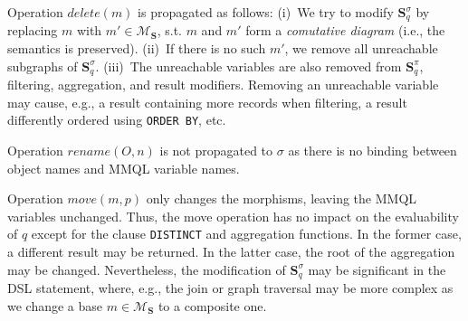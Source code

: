 Operation $delete(m)$ is propagated %
as follows: (i)~We try to modify $\mathbf{S}_q^{\sigma}$ by replacing $m$ with $m' \in \mathcal{M}_\mathbf{S}$, s.t. $m$ and $m'$ form a \textit{comutative diagram} (i.e., the semantics is preserved). 
(ii)~If there is no such $m'$, we remove all unreachable subgraphs of 
$\mathbf{S}_q^{\sigma}$.
(iii)~The unreachable variables are also removed from $\mathbf{S}_q^\pi$, filtering, aggregation, and result modifiers. %
Removing an unreachable variable may cause, e.g., a result containing more records when filtering, a result differently ordered using \texttt{ORDER BY}, etc.  

Operation $\textit{rename}(O, n)$ is not propagated to $\sigma$ as there is no binding between object names and MMQL variable names.

Operation $\textit{move}(m, p)$ only changes the morphisms, 
leaving the MMQL variables unchanged. Thus, the move operation has no impact on the evaluability of $q$ except for the clause \texttt{DISTINCT} and aggregation functions. In the former case, a different result may be returned. In the latter case, the root of the aggregation may be changed.
Nevertheless, the modification of $\mathbf{S}_q^\sigma$ may be significant in the DSL statement, where, e.g., the join or graph traversal may be more complex as we change a base $m \in \mathcal{M}_\mathbf{S}$ to a composite one.

